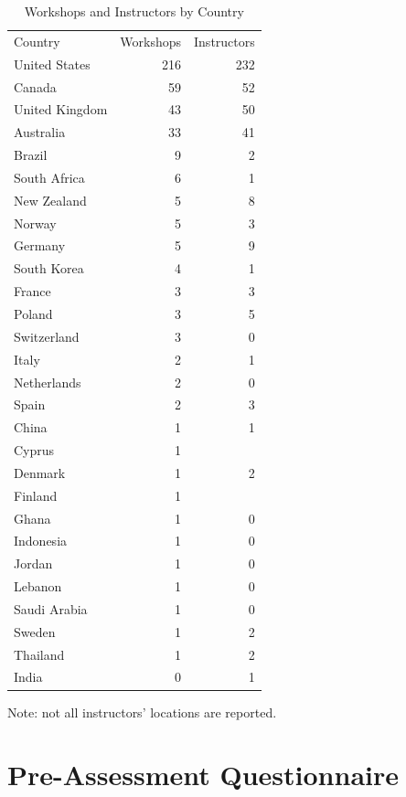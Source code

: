 \documentclass[10pt,a4paper,twocolumn]{article}
\begin{document}
\begin{table}
\begin{tabular}{lrr}
Country & Workshops & Instructors \\
United States & 216 & 232 \\
Canada & 59 & 52 \\
United Kingdom & 43 & 50 \\
Australia & 33 & 41 \\
Brazil & 9 & 2 \\
South Africa & 6 & 1 \\
New Zealand & 5 & 8 \\
Norway & 5 & 3 \\
Germany & 5 & 9 \\
South Korea & 4 & 1 \\
France & 3 & 3 \\
Poland & 3 & 5 \\
Switzerland & 3 & 0 \\
Italy & 2 & 1 \\
Netherlands & 2 & 0 \\
Spain & 2 & 3 \\
China & 1 & 1 \\
Cyprus & 1 & \\
Denmark & 1 & 2 \\
Finland & 1 & \\
Ghana & 1 & 0 \\
Indonesia & 1 & 0 \\
Jordan & 1 & 0 \\
Lebanon & 1 & 0 \\
Saudi Arabia & 1 & 0 \\
Sweden & 1 & 2 \\
Thailand & 1 & 2 \\
India & 0 & 1 \\
\end{tabular}

Note: not all instructors' locations are reported.

\caption{Workshops and Instructors by Country}
\label{t:by-country}
\end{table}

\nocite{*}
{\small
}

\appendix

\section{Pre-Assessment Questionnaire}
\end{document}
